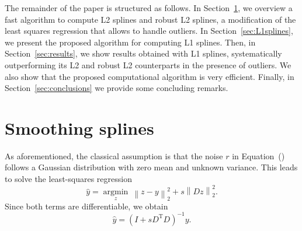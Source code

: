 \documentclass[preprint]{imsart}
\newcommand{\argmin}[1]{\underset{#1}{\operatorname{argmin}}\ }
\newcommand{\transpose}[1]{#1^\mathrm{T}}
\newcommand{\norm}[2]{\left\| #1 \right\|_{#2}}
\begin{document}
The remainder of the paper is structured as follows. In Section~\ref{sec:L2splines}, we overview a fast algorithm to compute L2 splines and robust L2 splines, a modification of the least squares regression that allows to handle outliers. In Section~\ref{sec:L1splines}, we present the proposed algorithm for computing L1 splines. Then, in Section~\ref{sec:results}, we show results obtained with L1 splines, systematically outperforming its L2 and robust L2 counterparts in the presence of outliers. We also show that the proposed computational algorithm is very efficient. Finally, in Section~\ref{sec:conclusions} we provide some concluding remarks.

\section{Smoothing splines}
\label{sec:L2splines}

As aforementioned, the classical assumption is that the noise $r$ in Equation~() follows a Gaussian distribution with zero mean and unknown variance. This leads to solve the least-squares regression
\begin{equation}
    \hat{y} = \argmin{z} \norm{z - y}{2}^2 + s \norm{Dz}{2}^ 2 .
    \label{eq:LSformulation}
\end{equation}
Since both terms are differentiable, we obtain
\begin{equation}
     \hat{y} = (I + s \transpose{D} D)^{-1} y .
     \label{eq:LSsolution}
\end{equation}
\end{document}
